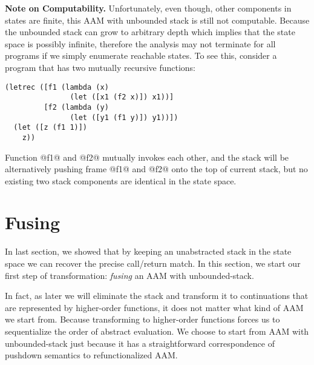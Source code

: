 \documentclass[acmsmall,review,anonymous]{acmart}\settopmatter{printfolios=true,printccs=false,printacmref=false}
\begin{document}
\textbf{Note on Computability.}
Unfortunately, even though, other components in states are finite, 
this AAM with unbounded stack is still not computable. 
Because the unbounded stack can grow to arbitrary depth which implies that the state space is possibly 
infinite, therefore the analysis may not terminate for all programs if we simply enumerate reachable states.
To see this, consider a program that has two mutually recursive functions:

\begin{lstlisting}
(letrec ([f1 (lambda (x) 
               (let ([x1 (f2 x)]) x1))]
         [f2 (lambda (y)
               (let ([y1 (f1 y)]) y1))])
  (let ([z (f1 1)])
    z))
\end{lstlisting}

Function @f1@ and @f2@ mutually invokes each other, and the stack will be 
alternatively pushing frame @f1@ and @f2@ onto the top of current stack, 
but no existing two stack components are identical in the state space.

\section{Fusing} \label{fusing}

In last section, we showed that by keeping an unabstracted stack in the state 
space we can recover the precise call/return match. In this section, we start
our first step of transformation: \textit{fusing} an AAM with unbounded-stack.

In fact, as later we will eliminate the stack and transform it to continuations
that are represented by higher-order functions, it does not matter what kind of 
AAM we start from. 
Because transforming to higher-order functions forces us to sequentialize 
the order of abstract evaluation.
We choose to start from AAM with unbounded-stack just because it has a 
straightforward correspondence of pushdown semantics to refunctionalized AAM.
\end{document}
